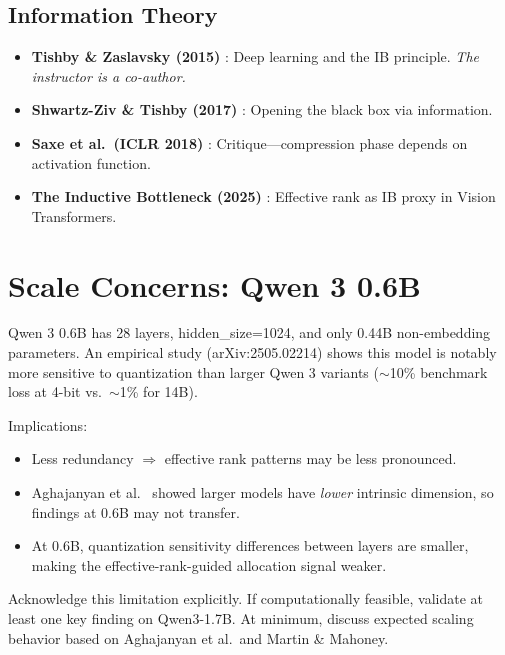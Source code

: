 \documentclass[11pt,a4paper]{article}
\begin{document}
\subsection{Information Theory}
\begin{itemize}
    \item \textbf{Tishby \& Zaslavsky (2015)} \cite{tishby2015deep}: Deep learning and the IB principle. \emph{The instructor is a co-author.}
    \item \textbf{Shwartz-Ziv \& Tishby (2017)} \cite{shwartzziv2017opening}: Opening the black box via information.
    \item \textbf{Saxe et al.\ (ICLR 2018)} \cite{saxe2018information}: Critique---compression phase depends on activation function.
    \item \textbf{The Inductive Bottleneck (2025)} \cite{inductivebottleneck2025}: Effective rank as IB proxy in Vision Transformers.
\end{itemize}

\section{Scale Concerns: Qwen 3 0.6B}

\begin{warningbox}
Qwen 3 0.6B has 28 layers, hidden\_size=1024, and only 0.44B non-embedding parameters. An empirical study (arXiv:2505.02214) \cite{qwen3quant2025} shows this model is notably more sensitive to quantization than larger Qwen 3 variants ($\sim$10\% benchmark loss at 4-bit vs.\ $\sim$1\% for 14B).
\end{warningbox}

Implications:
\begin{itemize}
    \item Less redundancy $\Rightarrow$ effective rank patterns may be less pronounced.
    \item Aghajanyan et al.\ \cite{aghajanyan2020intrinsic} showed larger models have \emph{lower} intrinsic dimension, so findings at 0.6B may not transfer.
    \item At 0.6B, quantization sensitivity differences between layers are smaller, making the effective-rank-guided allocation signal weaker.
\end{itemize}

\begin{fixbox}
Acknowledge this limitation explicitly. If computationally feasible, validate at least one key finding on Qwen3-1.7B. At minimum, discuss expected scaling behavior based on Aghajanyan et al.\ and Martin \& Mahoney.
\end{fixbox}
\end{document}
